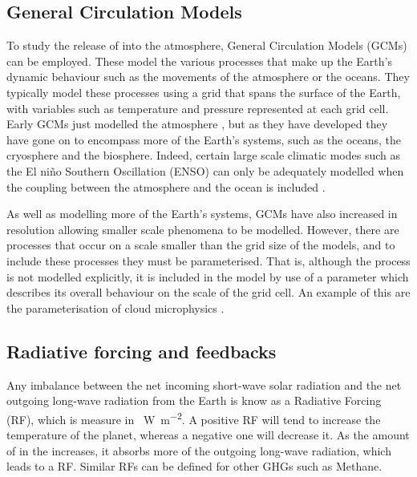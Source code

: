 \documentclass{article}
\begin{document}
\subsection{General Circulation Models}
To study the release of  into the atmosphere, General Circulation Models (GCMs) can be employed. These model the various processes that make up the Earth's dynamic behaviour such as the movements of the atmosphere or the oceans. They typically model these processes using a grid that spans the surface of the Earth, with variables such as temperature and pressure represented at each grid cell. Early GCMs just modelled the atmosphere \parencite{holloway1971simulation}, but as they have developed they have gone on to encompass more of the Earth's systems, such as the oceans, the cryosphere and the biosphere. Indeed, certain large scale climatic modes such as the El ni{\~n}o Southern Oscillation (ENSO) can only be adequately modelled when the coupling between the atmosphere and the ocean is included \parencite{neelin2011climate}. 

As well as modelling more of the Earth's systems, GCMs have also increased in resolution allowing smaller scale phenomena to be modelled. However, there are processes that occur on a scale smaller than the grid size of the models, and to include these processes they must be parameterised. That is, although the process is not modelled explicitly, it is included in the model by use of a parameter which describes its overall behaviour on the scale of the grid cell. An example of this are the parameterisation of cloud microphysics \parencite{walko1995new, neelin2011climate}.

\subsection{Radiative forcing and feedbacks}
Any imbalance between the net incoming short-wave solar radiation and the net outgoing long-wave radiation from the Earth is know as a Radiative Forcing (RF), which is measure in \SI{}{W.m^{-2}}. A positive RF will tend to increase the temperature of the planet, whereas a negative one will decrease it. As the amount of  in the increases, it absorbs more of the outgoing long-wave radiation, which leads to a RF. Similar RFs can be defined for other GHGs such as Methane.
\end{document}
